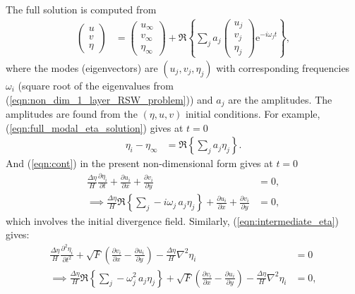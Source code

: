 \documentclass[10pt,reqno]{amsart}
\newcommand{\expe}{{\mathrm e}}
\begin{document}
The full solution is computed from 
\begin{align}
\begin{pmatrix}
u \\
v \\
\eta
\end{pmatrix} & = 
\begin{pmatrix}
u_\infty \\
v_\infty \\
\eta_\infty
\end{pmatrix} +
\Re \left\{
\sum_j 
a_{j}  \begin{pmatrix}
u_j \\
v_j \\
\eta_j
\end{pmatrix} 
\expe^{- i \omega_j t}
\right\} ,
\label{eqn:full_modal_eta_solution}
\end{align}
where the modes (eigenvectors) are $\left( u_j, v_j, \eta_j \right)$ with corresponding frequencies $\omega_i$ (square root of the eigenvalues from (\ref{eqn:non_dim_1_layer_RSW_problem})) and $a_{j}$ are the amplitudes.
The amplitudes are found from the $(\eta, u, v)$ initial conditions.
For example, (\ref{eqn:full_modal_eta_solution}) gives at $t=0$
\begin{align}
\eta_i - \eta_\infty & =  \Re \left\{ \sum_j  a_{j} \eta_j \right\} . 
\label{eqn:eta_constraint}
\end{align}
And (\ref{eqn:cont}) in the present non-dimensional form gives at $t=0$
\begin{align}
\frac{\Delta \eta}{H} \frac{\partial \eta_i}{\partial t } + \frac{\partial u_i}{\partial x} + \frac{\partial v_i}{\partial y}  &= 0 , \nonumber \\
\implies
\frac{\Delta \eta}{H} \Re \left\{ \sum_j - i \omega_j \, a_{j} \eta_j \right\}  +  \frac{\partial u_i}{\partial x} + \frac{\partial v_i}{\partial y}  &= 0 , \label{eqn:eta_tendency_constraint}
\end{align}
which involves the initial divergence field.
Similarly, (\ref{eqn:intermediate_eta}) gives:
\begin{align}
\frac{\Delta \eta}{H} \frac{\partial^2 \eta_i}{\partial t^2 } + \sqrt{F} \left( \frac{\partial v_i}{\partial x} - \frac{\partial u_i}{\partial y} \right) - \frac{\Delta \eta}{H} \nabla^2 \eta_i &= 0   \nonumber \\
\implies
\frac{\Delta \eta}{H} \Re \left\{ \sum_j - \omega_j^2 \, a_{j} \eta_j \right\}  + \sqrt{F} \left( \frac{\partial v_i}{\partial x} - \frac{\partial u_i}{\partial y} \right) - \frac{\Delta \eta}{H} \nabla^2 \eta_i &= 0 , \label{eqn:eta_acceleration_constraint}
\end{align}
\end{document}
